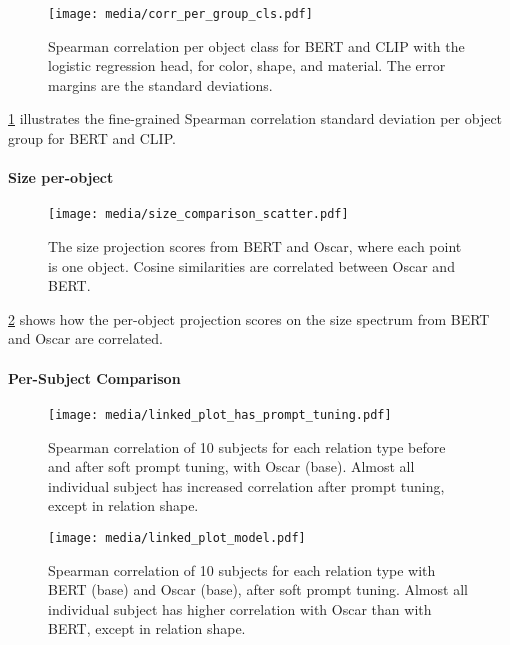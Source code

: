 \documentclass[11pt]{article}
\begin{document}
\begin{figure}[ht]
    \centering
    \texttt{[image: media/corr\_per\_group\_cls.pdf]}
    \caption{Spearman correlation per object class for BERT and CLIP with the logistic regression head, for color, shape, and material. The error margins are the standard deviations.}
    \label{fig:logsitic_reg_fig}
\end{figure}

\cref{fig:logsitic_reg_fig} illustrates the fine-grained Spearman correlation  standard deviation per object group for BERT and CLIP.

\paragraph{Size per-object}
\label{sec:size-per-object}

\begin{figure}[h]
    \texttt{[image: media/size\_comparison\_scatter.pdf]}
    \caption{The size projection scores from BERT and Oscar, where each point is one object. Cosine similarities are correlated between Oscar and BERT.}
    \label{fig:size_scatterplot}
\end{figure}

\cref{fig:size_scatterplot} shows how the per-object projection scores on the size spectrum from BERT and Oscar are correlated.


\paragraph{Per-Subject Comparison}
\label{sec:linked-plots}

\begin{figure*}[ht]
    \centering
    \texttt{[image: media/linked\_plot\_has\_prompt\_tuning.pdf]}
    \caption{Spearman correlation of 10 subjects for each relation type before and after soft prompt tuning, with Oscar (base). Almost all individual subject has increased correlation after prompt tuning, except in relation shape.}
    \label{fig:linked_tune_fig}

    \texttt{[image: media/linked\_plot\_model.pdf]}
    \caption{Spearman correlation of 10 subjects for each relation type with BERT (base) and Oscar (base), after soft prompt tuning. Almost all individual subject has higher correlation with Oscar than with BERT, except in relation shape.}
    \label{fig:linked_model_fig}
\end{figure*}
\end{document}
